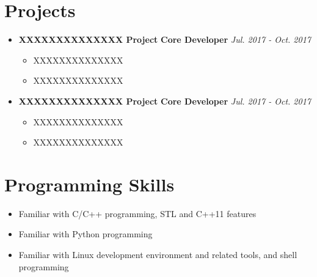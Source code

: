 \documentclass[letterpaper,11pt]{article}
\makeatletter
\newcommand{\projectSubheading}[3]{
  \vspace{-1pt}\item
      \textbf{#1}   \hspace{\stretch{1}} \textbf{\small{#2}} \space \textit{\small #3} \vspace{-5pt}
}
\newcommand{\resumeSubHeadingListStart}{\begin{itemize}[leftmargin=*]}
\newcommand{\resumeSubHeadingListEnd}{\end{itemize}}
\makeatother
\begin{document}
\section{Projects}
  \resumeSubHeadingListStart
    \projectSubheading
      {XXXXXXXXXXXXXX Project}{Core Developer}{Jul. 2017 - Oct. 2017}
      \begin{itemize}
        \item XXXXXXXXXXXXXX
        \item XXXXXXXXXXXXXX
      \end{itemize}

    \projectSubheading
      {XXXXXXXXXXXXXX Project}{Core Developer}{Jul. 2017 - Oct. 2017}
      \begin{itemize}
        \item XXXXXXXXXXXXXX
        \item XXXXXXXXXXXXXX
      \end{itemize}
  \resumeSubHeadingListEnd


\section{Programming Skills}
 \resumeSubHeadingListStart
    \item{Familiar with C/C++ programming, STL and C++11 features}\vspace{-5pt}
    \item{Familiar with Python programming}\vspace{-5pt}
    \item{Familiar with Linux development environment and related tools, and shell programming}\vspace{-5pt}
 \resumeSubHeadingListEnd


\end{document}
